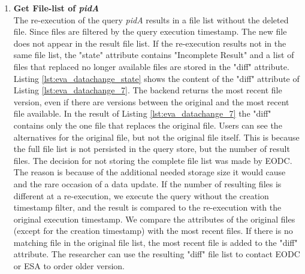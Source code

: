 \documentclass[draft,final]{vutinfth} %
\newenvironment{code}{\captionsetup{type=listing}}{}
\begin{document}
\begin{enumerate}
	\item \textbf{Get File-list of \textit{pidA}}\\ 
	The re-execution of the query \textit{pidA} results in a file list without the deleted file. Since files are filtered by the query execution timestamp. The new file does not appear in the result file list. {If the re-execution results not in the same file list, the "state" attribute contains "Incomplete Result" and a list of files that replaced no longer available files are stored in the "diff" attribute.} Listing \ref{lst:eva_datachange_state} shows the content of the "diff" attribute of Listing \ref{lst:eva_datachange_7}. The backend returns the most recent file version, even if there are versions between the original and the most recent file available. In the result of Listing \ref{lst:eva_datachange_7} the "diff" contains only the one file that replaces the original file. Users can see the alternatives for the original file, but not the original file itself. This is because the full file list is not persisted in the query store, but the number of result files. The decision for not storing the complete file list was made by EODC. The reason is because of the additional needed storage size it would cause and the rare occasion of a data update. If the number of resulting files is different at a re-execution, we execute the query without the {creation} timestamp filter, and the result is compared to the re-execution with the original execution timestamp. {We compare the attributes of the original files (except for the creation timestamp) with the most recent files. If there is no matching file in the original file list, the most recent file is added to the "diff" attribute.} The researcher can use the resulting "diff" file list to contact EODC or ESA to order older version.
	\begin{code}

\end{code}
\end{enumerate}
\end{document}
